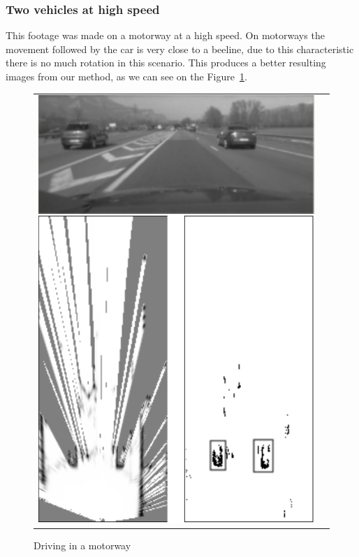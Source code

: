 \subsubsection{Two vehicles at high speed}

This footage was made on a motorway at a high speed. On motorways the movement followed by the car is very close to a beeline, due to this characteristic there is no much rotation in this scenario. This produces a better resulting images from our method, as we can see on the Figure~\ref{fig:result:scenetwocarshighway}.

\begin{figure}[H]
   \centering
     \begin{tabular}{lr}
       \includegraphics[scale=0.60]{img/fig:result:scenetwocarshighway}
     \end{tabular}
   \caption{Driving in a motorway}
   \label{fig:result:scenetwocarshighway}
\end{figure}

